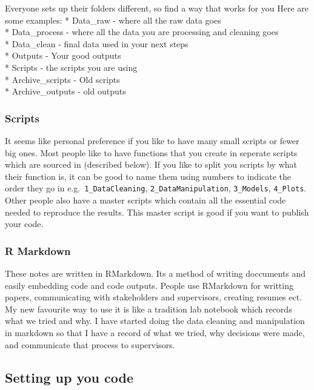 \documentclass[
]{article}
\begin{document}
Everyone sets up their folders different, so find a way that works for
you Here are some examples: * Data\_raw - where all the raw data goes\\
* Data\_process - where all the data you are processing and cleaning
goes\\
* Data\_clean - final data used in your next steps\\
* Outputs - Your good outputs\\
* Scripts - the scripts you are using\\
* Archive\_scripts - Old scripts\\
* Archive\_outputs - old outputs

\hypertarget{scripts}{%
\subsubsection{Scripts}\label{scripts}}

It seems like personal preference if you like to have many small scripts
or fewer big ones. Most people like to have functions that you create in
seperate scripts which are sourced in (described below). If you like to
split you scripts by what their function is, it can be good to name them
using numbers to indicate the order they go in
e.g.~\texttt{1\_DataCleaning}, \texttt{2\_DataManipulation},
\texttt{3\_Models}, \texttt{4\_Plots}. Other people also have a master
scripts which contain all the essential code needed to reproduce the
results. This master script is good if you want to publish your code.

\hypertarget{r-markdown}{%
\subsubsection{R Markdown}\label{r-markdown}}

These notes are written in RMarkdown. Its a method of writing doccuments
and easily embedding code and code outputs. People use RMarkdown for
writting papers, communicating with stakeholders and supervisors,
creating resumes ect. My new favourite way to use it is like a tradition
lab notebook which records what we tried and why. I have started doing
the data cleaning and manipulation in markdown so that I have a record
of what we tried, why decisions were made, and communicate that process
to supervisors.

\hypertarget{setting-up-you-code}{%
\subsection{Setting up you code}\label{setting-up-you-code}}
\end{document}
